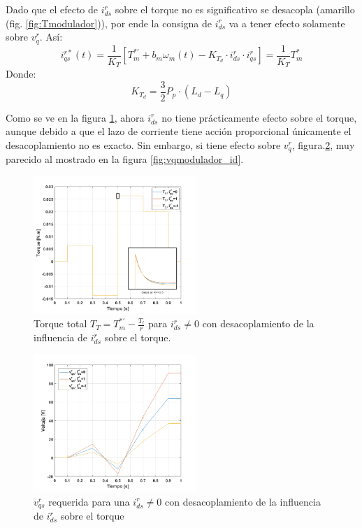 \documentclass[10pt]{article}
\begin{document}
Dado que el efecto de $i^{r}_{ds}$ sobre el torque no es significativo se desacopla (amarillo (fig. \ref{fig:Tmodulador})), por ende la consigna de $i^{r}_{ds}$ va a tener efecto solamente sobre $v^{r}_{q}$. Así:
			\begin{equation}
	i^{r*}_{qs}(t)=\frac{1}{K_{T}}[T^{*'}_{m}+b_{m}\omega_{m}(t)-K_{T_{d}}\cdot i^{r}_{ds}\cdot i^{r}_{qs}]=\frac{1}{K_{T}}T^{*}_{m}
	\label{eq:2.1.2.k.8}
	\end{equation}
	Donde:
				\begin{equation}
	K_{T_{d}}=\frac{3}{2}P_{p}\cdot (L_{d}-L_{q})
	\label{eq:2.1.2.k.9}
	\end{equation}
	
	Como se ve en la figura \ref{fig:TTmodulador_id2}, ahora $i^{r}_{ds}$ no tiene prácticamente efecto sobre el torque, aunque debido a que el lazo de corriente tiene acción proporcional únicamente el desacoplamiento no es exacto. Sin embargo, si tiene efecto sobre $v^{r}_{q}$, figura.\ref{fig:vqmodulador_id2}, muy parecido al mostrado en la figura \ref{fig:vqmodulador_id}.
		 	\begin{figure}[h!]
	\centering
	\includegraphics[width=0.55\textwidth]{TTmodulador_id2.png}
	\caption{\label{fig:TTmodulador_id2}Torque total $T_{T}=T^{*'}_{m}-\frac{T_{l}}{r}$ para $i^{r}_{ds}\neq0$ con desacoplamiento de la influencia de $i^{r}_{ds}$ sobre el torque. }
	\end{figure}
			 	\begin{figure}[h!]
	\centering
	\includegraphics[width=0.55\textwidth]{Tmodulador_id2.png}
	\caption{\label{fig:vqmodulador_id2}$v^{r}_{qs}$ requerida para una $i^{r}_{ds}\neq0$ con desacoplamiento de la influencia de $i^{r}_{ds}$ sobre el torque }
	\end{figure}
	
\end{document}
